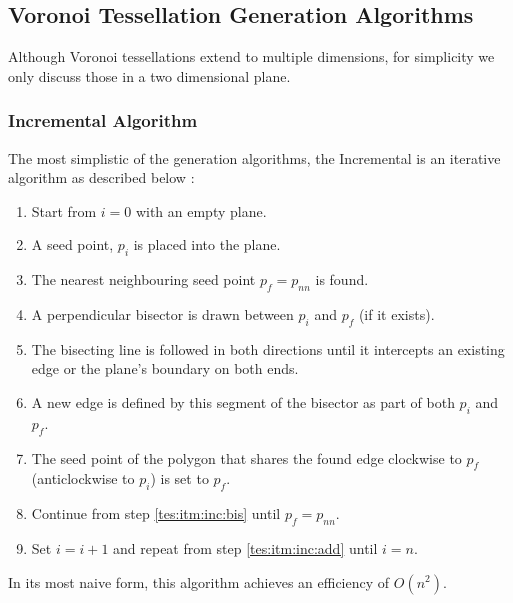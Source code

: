\subsection{Voronoi Tessellation Generation Algorithms}\label{tes:sec:tga}
Although Voronoi tessellations extend to multiple dimensions, for simplicity we only discuss those in a two dimensional plane.
%
\subsubsection{Incremental Algorithm}\label{tes:ssec:inc}
The most simplistic of the generation algorithms, the Incremental is an iterative algorithm as described below \citep{green1978computing} \citep{okabe2009spatial}:
\begin{enumerate}
\item Start from $i=0$ with an empty plane.
\item\label{tes:itm:inc:add} A seed point, $p_i$ is placed into the plane.
\item The nearest neighbouring seed point $p_f=p_{nn}$ is found.
\item\label{tes:itm:inc:bis} A perpendicular bisector is drawn between $p_i$ and $p_f$ (if it exists).
\item The bisecting line is followed in both directions until it intercepts an existing edge or the plane's boundary on both ends.
\item A new edge is defined by this segment of the bisector as part of both $p_i$ and $p_f$.
\item The seed point of the polygon that shares the found edge clockwise to $p_f$ (anticlockwise to $p_i$) is set to $p_f$.
\item Continue from step \ref{tes:itm:inc:bis} until $p_f=p_{nn}$.
\item Set $i = i +1$ and repeat from step \ref{tes:itm:inc:add} until $i=n$.
\end{enumerate}
In its most naive form, this algorithm achieves an efficiency of $O(n^2)$.
%
